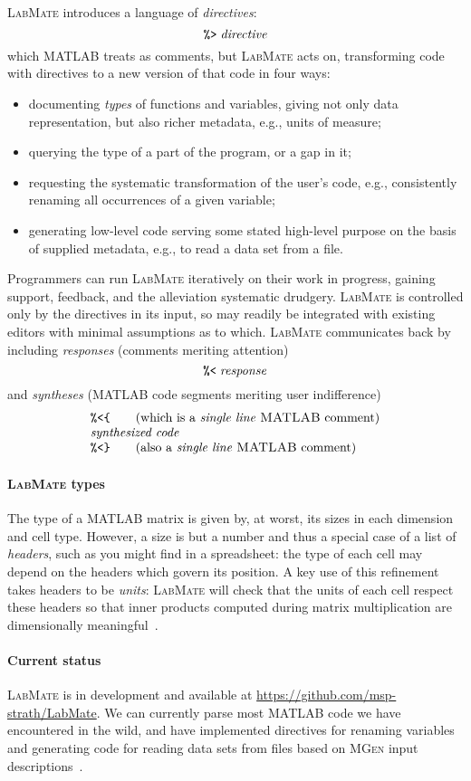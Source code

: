 \documentclass{ws-procs9x6}
\newcommand{\pct}{\texttt{\symbol{37}}}
\newcommand{\dir}{\texttt{\symbol{62}}}
\newcommand{\res}{\texttt{\symbol{60}}}
\newcommand{\lcb}{\texttt{\symbol{123}}}
\newcommand{\rcb}{\texttt{\symbol{125}}}
\newcommand{\lr}{\textsc{LabMate}}
\newcommand{\repo}{\url{https://github.com/msp-strath/LabMate}}
\newcommand{\ma}{\textsc{MATLAB}}
\newcommand{\remph}{\emph}
\begin{document}
\lr{} introduces a language of \emph{directives}:
\[\pct\dir\;\mathit{directive}
\]
which \ma{} treats as comments, but \lr{} acts on, transforming code with directives to a new version of that code in four ways:
\begin{itemize}
\item documenting \remph{types} of functions and variables, giving not only data representation, but also richer metadata, e.g., units of measure;
\item querying the type of a part of the program, or a gap in it;
\item requesting the systematic transformation of the user's code, e.g., consistently renaming all occurrences of a given variable;
\item generating low-level code serving some stated high-level purpose on the basis of supplied metadata, e.g., to read a data set from a file.
\end{itemize}
Programmers can run \lr{} iteratively on their work in progress, gaining support, feedback, and the alleviation systematic drudgery. \lr{} is controlled only by the directives in its input, so may readily be integrated with existing editors with minimal assumptions as to which. \lr{} communicates back by including \emph{responses} (comments meriting attention)
\[
\pct\res\;\mathit{response}
\]
and \emph{syntheses} (\ma{} code segments meriting user indifference)
\[\begin{array}{l}
\pct\res\lcb\qquad \mbox{(which is a \remph{single line} \ma{} comment)}\\
\mathit{synthesized}\; \mathit{code}\\
\pct\res\rcb\qquad \mbox{(also a \remph{single line} \ma{} comment)} \\
\end{array}\]

\paragraph{\lr{} types}

The type of a \ma{} matrix is given by, at worst, its sizes in each dimension and cell type. However, a size is but a number and thus a special case of a list of \remph{headers}, such as you might find in a spreadsheet: the type of each cell may depend on the headers which govern its position. A key use of this refinement takes headers to be \remph{units}: \lr{} will check that the units of each cell respect these headers so that inner products computed during matrix multiplication are dimensionally meaningful~\cite{dimTypes}.

\paragraph{Current status}

\lr{} is in development and available at \repo. We can currently parse most \ma{} code we have encountered in the wild, and have implemented directives for renaming variables and generating code for reading data sets from files based on \textsc{MGen} input descriptions~\cite{mgen}.



\end{document}
